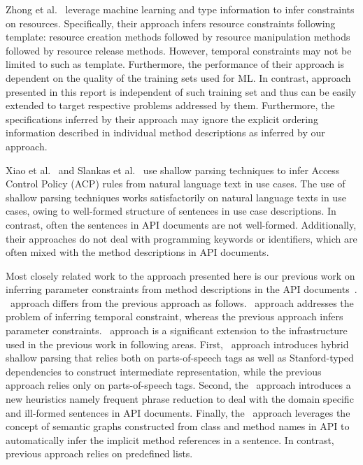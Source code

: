Zhong et al.~\cite{zhong09SE} leverage machine learning and type information to infer constraints on resources.
Specifically, their approach infers resource constraints following template: resource creation methods followed by resource manipulation methods followed by resource release methods.
However, temporal constraints may not be limited to such as template. 
Furthermore, the performance of their approach is dependent on the quality of the training sets used for ML.
In contrast, approach presented in this report is independent of such training set and thus can be easily extended to target respective problems addressed by them. Furthermore, the specifications inferred by their approach may ignore the explicit ordering information described in individual method descriptions as inferred by our approach.


Xiao et al.~\cite{XiaoFSE2012} and Slankas et al.~\cite{johnSlankasPASSAT13} use shallow parsing techniques to infer Access Control Policy (ACP) rules from natural language text in use cases.
The use of shallow parsing techniques works satisfactorily on natural language texts in use cases, owing to well-formed structure of sentences in use case descriptions.
In contrast, often the sentences in API documents are not well-formed.
Additionally, their approaches do not deal with programming keywords or identifiers, which are often mixed with the method descriptions in API documents.

Most closely related work to the approach presented here is our previous work on inferring parameter constraints from method descriptions in the API documents~\cite{pandita12:inferring}.
\tool\ approach differs from the previous approach as follows.
\tool\ approach addresses the problem of inferring temporal constraint, whereas the previous approach infers parameter constraints.
\tool\ approach is a significant extension to the infrastructure used in the previous work in following areas.
First, \tool\ approach introduces hybrid shallow parsing that relies both on parts-of-speech tags as well as Stanford-typed dependencies to construct intermediate representation, while the previous approach relies only on parts-of-speech tags.
Second, the \tool\ approach introduces a new heuristics namely frequent phrase reduction to deal with the domain specific and ill-formed sentences in API documents.
Finally, the \tool\ approach leverages the concept of semantic graphs constructed from class and method names in API to automatically infer the implicit method references in a sentence. In contrast, previous approach relies on predefined lists.  


